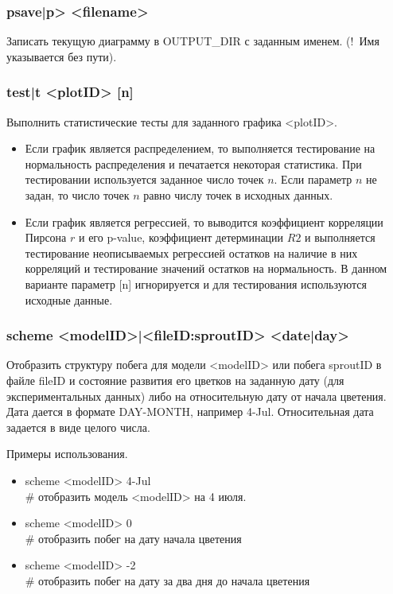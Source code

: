 \documentclass[a4paper]{article}
\begin{document}
\subsubsection{psave|p> <filename>}
Записать текущую диаграмму в OUTPUT\_DIR с заданным именем. (!~Имя указывается без пути).

\subsubsection{test|t <plotID> [n]}
Выполнить статистические тесты для заданного графика <plotID>. 
\begin{itemize}
\item Если график является распределением, то выполняется тестирование на нормальность распределения и печатается некоторая статистика. При тестировании используется заданное число точек $n$. Если параметр $n$ не задан, то число точек $n$ равно числу точек в исходных данных.
\item Если график является регрессией, то выводится коэффициент корреляции Пирсона $r$ и его p-value, коэффициент детерминации $R2$ и выполняется тестирование неописываемых регрессией остатков на наличие в них корреляций и тестирование значений остатков на нормальность. В данном варианте параметр [n] игнорируется и для тестирования используются исходные данные.
\end{itemize}

\subsubsection{scheme <modelID>|<fileID:sproutID> <date|day>}
Отобразить структуру побега для модели <modelID> или побега sproutID в файле fileID и состояние развития его цветков на заданную дату (для экспериментальных данных) либо на относительную дату от начала цветения. Дата дается в формате DAY-MONTH, например 4-Jul. Относительная дата задается в виде целого числа.

Примеры использования.
\begin{itemize}
\item scheme <modelID> 4-Jul    
\\ \# отобразить модель <modelID> на 4 июля.

\item scheme <modelID> 0        
\\ \# отобразить побег на дату начала цветения

\item scheme <modelID> -2
\\ \# отобразить побег на дату за два дня до начала цветения

\end{itemize}
\end{document}
